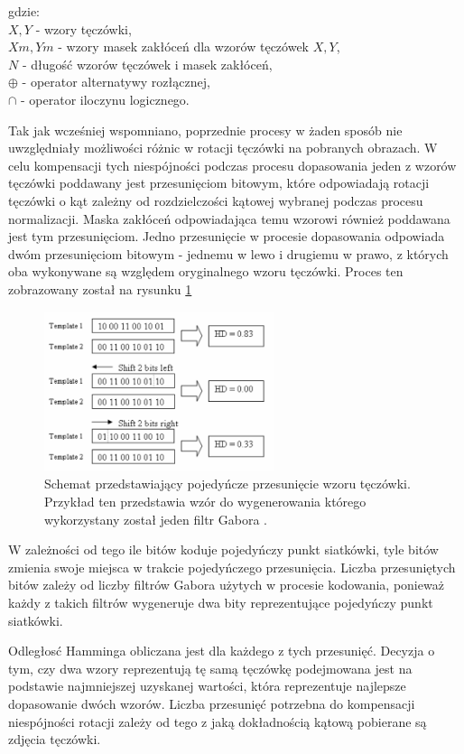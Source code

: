\noindent
gdzie:\\
\indent $X, Y$ - wzory tęczówki,\\
\indent $\mathit{Xm}, \mathit{Ym}$ - wzory masek zakłóceń dla wzorów tęczówek $X, Y$,\\
\indent $N$ - długoś\'c wzorów tęczówek i masek zakłóceń,\\
\indent $\oplus$ - operator alternatywy rozłącznej,\\
\indent $\cap$ - operator iloczynu logicznego.\newline

Tak jak wcześniej wspomniano, poprzednie procesy w żaden sposób nie uwzględniały możliwości różnic
w rotacji tęczówki na pobranych obrazach. W celu kompensacji tych niespójności podczas procesu
dopasowania jeden z wzorów tęczówki poddawany jest przesunięciom bitowym, które odpowiadają rotacji
tęczówki o kąt zależny od rozdzielczości kątowej wybranej podczas procesu normalizacji. Maska zakłóceń
odpowiadająca temu wzorowi również poddawana jest tym przesunięciom.
Jedno przesunięcie w procesie dopasowania odpowiada dwóm przesunięciom bitowym - jednemu w lewo i
drugiemu w prawo, z których oba wykonywane są względem oryginalnego wzoru tęczówki. Proces ten
zobrazowany został na rysunku \ref{fig:matchingShifting}

\begin{figure}
  \centering
  \includegraphics[width=0.6\textwidth]{images/matching/shifting.png}
  \caption{Schemat przedstawiający pojedyńcze przesunięcie wzoru tęczówki. Przykład ten przedstawia
  wzór do wygenerowania którego wykorzystany został jeden filtr Gabora \cite{masek}.}
  \label{fig:matchingShifting}
\end{figure}

W zależności od tego ile bitów koduje pojedyńczy punkt siatkówki, tyle bitów zmienia swoje miejsca
w trakcie pojedyńczego przesunięcia. Liczba przesuniętych bitów zależy od liczby filtrów Gabora
użytych w procesie kodowania, ponieważ każdy z takich filtrów wygeneruje dwa bity reprezentujące
pojedyńczy punkt siatkówki.

Odległos\'c Hamminga obliczana jest dla każdego z tych przesunię\'c. Decyzja o tym, czy dwa wzory
reprezentują tę samą tęczówkę podejmowana jest na podstawie najmniejszej uzyskanej wartości,
która reprezentuje najlepsze dopasowanie dwóch wzorów. Liczba przesunię\'c potrzebna do kompensacji
niespójności rotacji zależy od tego z jaką dokładnością kątową pobierane są zdjęcia tęczówki.
